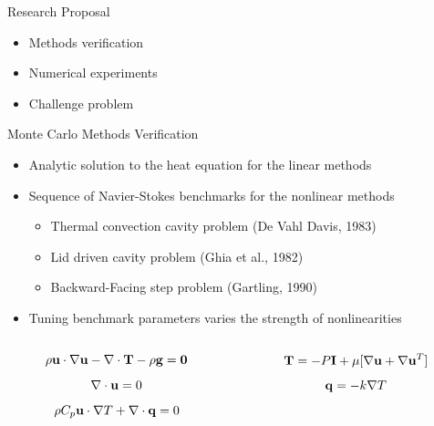 \documentclass{beamer}
\begin{document}
\begin{frame}{Research Proposal}

  \large{
  \begin{itemize}
  \item Methods verification
  \medskip \medskip \medskip \medskip \medskip
  \item Numerical experiments
    \medskip \medskip \medskip \medskip \medskip
  \item Challenge problem
  \end{itemize}
  }

\end{frame}

\begin{frame}{Monte Carlo Methods Verification}

  \begin{itemize}
  \item Analytic solution to the heat equation for the linear methods
    \medskip
  \item Sequence of Navier-Stokes benchmarks for the nonlinear methods
    \begin{itemize}
    \item Thermal convection cavity problem (De Vahl Davis, 1983)
    \item Lid driven cavity problem (Ghia et al., 1982)
    \item Backward-Facing step problem (Gartling, 1990)
    \end{itemize}
    \medskip
  \item Tuning benchmark parameters varies the strength of
    nonlinearities
  \end{itemize}

  \medskip  \medskip
  \begin{columns}
    \begin{column}{0.5\textwidth}
      \[
      \rho \mathbf{u} \cdot \nabla \mathbf{u} - \nabla \cdot \mathbf{T} - \rho
      \mathbf{g} = \mathbf{0}
      \]
      \[
      \nabla \cdot \mathbf{u} = 0
      \]
      \[
      \rho C_p \mathbf{u} \cdot \nabla T + \nabla \cdot \mathbf{q} = 0
      \]
    \end{column}

    \begin{column}{0.5\textwidth}
      \[
      \mathbf{T} = -P \mathbf{I} + \mu[\nabla \mathbf{u} + \nabla \mathbf{u}^T]
      \]
      \[
      \mathbf{q} = - k \nabla T
      \]
    \end{column}
  \end{columns}

\end{frame}
\end{document}
